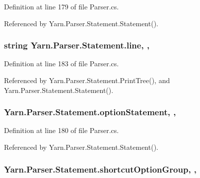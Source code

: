 Definition at line 179 of file Parser.\-cs.



Referenced by Yarn.\-Parser.\-Statement.\-Statement().

\hypertarget{a00160_a37695c7b00776bb292fd64894a70fb72}{
\subsubsection[{line}]{\setlength{\rightskip}{0pt plus 5cm}string Yarn.\-Parser.\-Statement.\-line\hspace{0.3cm}{\ttfamily [get]}, {\ttfamily [set]}, {\ttfamily [package]}}}\label{a00160_a37695c7b00776bb292fd64894a70fb72}


Definition at line 183 of file Parser.\-cs.



Referenced by Yarn.\-Parser.\-Statement.\-Print\-Tree(), and Yarn.\-Parser.\-Statement.\-Statement().

\hypertarget{a00160_a15020b7dab4983adbd185d5c2c2ebe84}{
\subsubsection[{option\-Statement}]{ Yarn.\-Parser.\-Statement.\-option\-Statement\hspace{0.3cm}{\ttfamily [get]}, {\ttfamily [set]}, {\ttfamily [package]}}}\label{a00160_a15020b7dab4983adbd185d5c2c2ebe84}


Definition at line 180 of file Parser.\-cs.



Referenced by Yarn.\-Parser.\-Statement.\-Statement().

\hypertarget{a00160_a54d73ad69c4af4a0d61edeaea4c8ca4f}{
\subsubsection[{shortcut\-Option\-Group}]{ Yarn.\-Parser.\-Statement.\-shortcut\-Option\-Group\hspace{0.3cm}{\ttfamily [get]}, {\ttfamily [set]}, {\ttfamily [package]}}}\label{a00160_a54d73ad69c4af4a0d61edeaea4c8ca4f}


